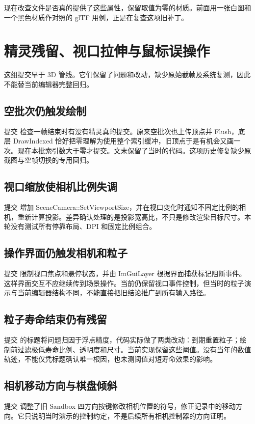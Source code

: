 现在改查文件是否真的提供了这些属性，保留取值为零的材质。前面用一张白图和一个黑色材质作对照的 glTF 用例，正是在复查这项旧补丁。

\newpage
\section{精灵残留、视口拉伸与鼠标误操作}
这组提交早于 3D 管线。它们保留了问题和改动，缺少原始截帧及系统复测，因此不能替当前编辑器完整回归。

\subsection{空批次仍触发绘制}
提交  检查一帧结束时有没有精灵真的提交。原来空批次也上传顶点并 Flush，底层 DrawIndexed 恰好把零理解为使用整个索引缓冲，旧顶点于是有机会又画一次。现在本批索引数大于零才提交。文末保留了当时的代码。这项历史修复缺少原截图与空帧切换的专用回归。

\subsection{视口缩放使相机比例失调}
提交  增加 SceneCamera::SetViewportSize，并在视口变化时通知不固定比例的相机，重新计算投影。差异确认处理的是投影宽高比，不只是修改渲染目标尺寸。本轮没有测试所有停靠布局、DPI 和固定比例组合。

\subsection{操作界面仍触发相机和粒子}
提交  限制视口焦点和悬停状态，并由 ImGuiLayer 根据界面捕获标记阻断事件。这样界面交互不应继续传到场景操作。当前仍保留视口事件控制，但当时的粒子演示与当前编辑器结构不同，不能直接把旧结论推广到所有输入路径。

\subsection{粒子寿命结束仍有残留}
提交  的标题将问题归因于浮点精度，代码实际做了两类改动：到期重置粒子；绘制前过滤极低寿命比例、透明度和尺寸。当前实现保留这些阈值。没有当年的数值轨迹，不能仅凭标题确认唯一根因，也未测阈值对短寿命效果的影响。

\subsection{相机移动方向与棋盘倾斜}
提交  调整了旧 Sandbox 四方向按键修改相机位置的符号，修正记录中的移动方向。它只说明当时演示的控制约定，不是后续所有相机控制器的方向证明。

